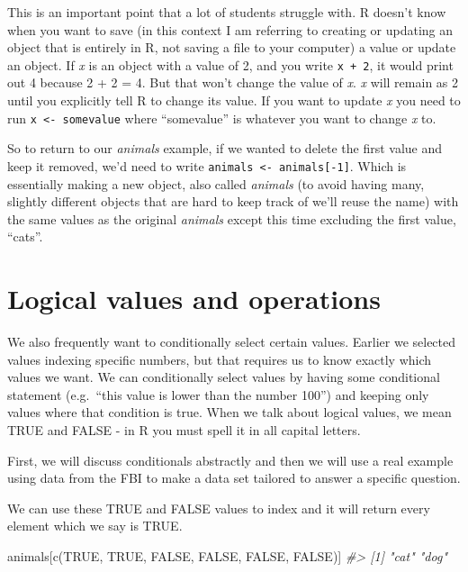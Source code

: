 \documentclass[
]{krantz}
\makeatletter
\newenvironment{Shaded}{\begin{snugshade}}{\end{snugshade}}
\newcommand{\CommentTok}[1]{\textcolor[rgb]{0.37,0.37,0.37}{\textit{#1}}}
\newcommand{\ConstantTok}[1]{\textcolor[rgb]{0,0,0}{#1}}
\newcommand{\FunctionTok}[1]{\textcolor[rgb]{0,0,0}{#1}}
\newcommand{\NormalTok}[1]{#1}
\newenvironment{kframe}{%
\medskip{}
\setlength{\fboxsep}{.8em}
 \def\at@end@of@kframe{}%
 \ifinner\ifhmode%
  \def\at@end@of@kframe{\end{minipage}}%
  \begin{minipage}{\columnwidth}%
 \fi\fi%
 \def\FrameCommand##1{\hskip\@totalleftmargin \hskip-\fboxsep
 \colorbox{shadecolor}{##1}\hskip-\fboxsep
     \hskip-\linewidth \hskip-\@totalleftmargin \hskip\columnwidth}%
 \MakeFramed {\advance\hsize-\width
   \@totalleftmargin\z@ \linewidth\hsize
   \@setminipage}}%
 {\par\unskip\endMakeFramed%
 \at@end@of@kframe}
\renewenvironment{Shaded}{\begin{kframe}}{\end{kframe}}
\makeatother
\begin{document}
This is an important point that a lot of students struggle with. R doesn't know when you want to save (in this context I am referring to creating or updating an object that is entirely in R, not saving a file to your computer) a value or update an object. If \emph{x} is an object with a value of 2, and you write \texttt{x\ +\ 2}, it would print out 4 because 2 + 2 = 4. But that won't change the value of \emph{x}. \emph{x} will remain as 2 until you explicitly tell R to change its value. If you want to update \emph{x} you need to run \texttt{x\ \textless{}-\ somevalue} where ``somevalue'' is whatever you want to change \emph{x} to.

So to return to our \emph{animals} example, if we wanted to delete the first value and keep it removed, we'd need to write \texttt{animals\ \textless{}-\ animals{[}-1{]}}. Which is essentially making a new object, also called \emph{animals} (to avoid having many, slightly different objects that are hard to keep track of we'll reuse the name) with the same values as the original \emph{animals} except this time excluding the first value, ``cats''.

\hypertarget{logical-values-and-operations}{%
\section{Logical values and operations}\label{logical-values-and-operations}}

We also frequently want to conditionally select certain values. Earlier we selected values indexing specific numbers, but that requires us to know exactly which values we want. We can conditionally select values by having some conditional statement (e.g.~``this value is lower than the number 100'') and keeping only values where that condition is true. When we talk about logical values, we mean TRUE and FALSE - in R you must spell it in all capital letters.

First, we will discuss conditionals abstractly and then we will use a real example using data from the FBI to make a data set tailored to answer a specific question.

We can use these TRUE and FALSE values to index and it will return every element which we say is TRUE.

\begin{Shaded}
\begin{Highlighting}[]
\NormalTok{animals[}\FunctionTok{c}\NormalTok{(}\ConstantTok{TRUE}\NormalTok{, }\ConstantTok{TRUE}\NormalTok{, }\ConstantTok{FALSE}\NormalTok{, }\ConstantTok{FALSE}\NormalTok{, }\ConstantTok{FALSE}\NormalTok{, }\ConstantTok{FALSE}\NormalTok{)]}
\CommentTok{\#\textgreater{} [1] "cat" "dog"}
\end{Highlighting}
\end{Shaded}
\end{document}
